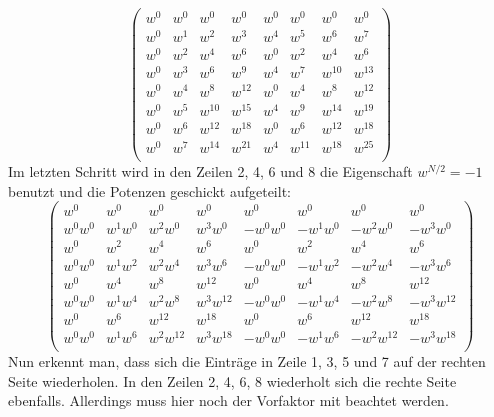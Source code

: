 \begin{equation*}
\left( \begin{array}{cccccccc}
w^{0} & w^{0} & w^{0} & w^{0} & w^{0} & w^{0} & w^{0} & w^{0}\\
w^{0} & w^{1} & w^{2} & w^{3} & w^{4} & w^{5} & w^{6} & w^{7}\\
w^{0} & w^{2} & w^{4} & w^{6} & w^{0} & w^{2} & w^{4} & w^{6}\\
w^{0} & w^{3} & w^{6} & w^{9} & w^{4} & w^{7} & w^{10} & w^{13}\\
w^{0} & w^{4} & w^{8} & w^{12} & w^{0} & w^{4} & w^{8} & w^{12}\\
w^{0} & w^{5} & w^{10} & w^{15} & w^{4} & w^{9} & w^{14} & w^{19}\\
w^{0} & w^{6} & w^{12} & w^{18} & w^{0} & w^{6} & w^{12} & w^{18}\\
w^{0} & w^{7} & w^{14} & w^{21} & w^{4} & w^{11} & w^{18} & w^{25}\\
\end{array} \right)
\end{equation*}
Im letzten Schritt wird in den Zeilen 2, 4, 6 und 8 die Eigenschaft $w^{N/2} = -1$ benutzt und die Potenzen geschickt aufgeteilt:
\begin{equation*}
\left( \begin{array}{cccccccc}
w^{0} & w^{0} & w^{0} & w^{0} & w^{0} & w^{0} & w^{0} & w^{0}\\
w^{0}w^{0} & w^{1}w^{0} & w^{2}w^{0} & w^{3}w^{0} & -w^{0}w^{0} & -w^{1}w^{0} & -w^{2}w^{0} & -w^{3}w^{0}\\
w^{0} & w^{2} & w^{4} & w^{6} & w^{0} & w^{2} & w^{4} & w^{6}\\
w^{0}w^{0} & w^{1}w^{2} & w^{2}w^{4} & w^{3}w^{6} & -w^{0}w^{0} & -w^{1}w^{2} & -w^{2}w^{4} & -w^{3}w^{6}\\
w^{0} & w^{4} & w^{8} & w^{12} & w^{0} & w^{4} & w^{8} & w^{12}\\
w^{0}w^{0} & w^{1}w^{4} & w^{2}w^{8} & w^{3}w^{12} & -w^{0}w^{0} & -w^{1}w^{4} & -w^{2}w^{8} & -w^{3}w^{12}\\
w^{0} & w^{6} & w^{12} & w^{18} & w^{0} & w^{6} & w^{12} & w^{18}\\
w^{0}w^{0} & w^{1}w^{6} & w^{2}w^{12} & w^{3}w^{18} & -w^{0}w^{0} & -w^{1}w^{6} & -w^{2}w^{12} & -w^{3}w^{18}\\
\end{array} \right)
\end{equation*} 
Nun erkennt man, dass sich die Einträge in Zeile 1, 3, 5 und 7 auf der rechten Seite wiederholen. In den Zeilen 2, 4, 6, 8 wiederholt sich die rechte Seite ebenfalls. Allerdings muss hier noch der Vorfaktor mit beachtet werden.

